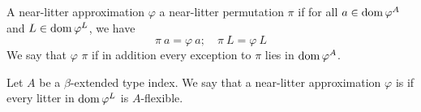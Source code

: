 \begin{definition}
    A near-litter approximation \( \varphi \)  a near-litter permutation \( \pi \) if for all \( a \in \operatorname{dom} \varphi^A \) and \( L \in \operatorname{dom} \varphi^L \), we have
    \[ \pi\ a = \varphi\ a;\quad \pi\ L = \varphi\ L \]
    We say that \( \varphi \)  \( \pi \) if in addition every exception to \( \pi \) lies in \( \operatorname{dom} \varphi^A \).
\end{definition}
\begin{definition}
    Let \( A \) be a \( \beta \)-extended type index.
    We say that a near-litter approximation \( \varphi \) is  if every litter in \( \operatorname{dom} \varphi^L \) is \( A \)-flexible.
\end{definition}
